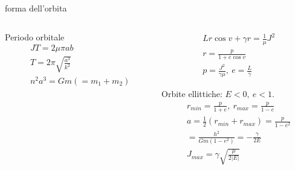 \begin{frame}{forma dell'orbita}
\begin{columns}
\begin{column}{0.4\textwidth}

\begin{block}{Periodo orbitale}
\begin{align*}
&JT=2\mu\pi ab\\
&T=2\pi\sqrt{\frac{a^3}{k^2}}\\
&n^2a^3=Gm(=m_1+m_2)
\end{align*}
\end{block}
\end{column}
\begin{column}{0.6\textwidth}
\begin{align*}
&Lr\cos{v}+\gamma r=\frac{1}{\mu}J^2\\
&r=\frac{p}{1+e\cos{v}}\\
&p=\frac{J^2}{\gamma\mu},\ e=\frac{L}{\gamma}
\end{align*}
\begin{block}{Orbite ellittiche: $E<0,\ e<1$.}
\begin{align*}
&r_{min}=\frac{p}{1+e},\ r_{max}=\frac{p}{1-e}\\
&a=\frac{1}{2}(r_{min}+r_{max})=\frac{p}{1-e^2}\\
&=\frac{h^2}{Gm(1-e^2)}=-\frac{\gamma}{2E}\\
&J_{max}=\gamma\sqrt{\frac{\mu}{2|E|}}
\end{align*}
\end{block}
\end{column}
\end{columns}
\end{frame}

